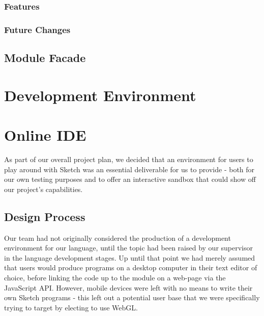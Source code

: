 \documentclass{l3proj}
\begin{document}
\subsection{Features}
\label{arch-shad-features}

\subsection{Future Changes}
\label{arch-shad-future}

\section{Module Facade}
\label{arch-module}

\chapter{Development Environment}
\label{dev}

\chapter{Online IDE}
\label{ide}
As part of our overall project plan, we decided that an environment for users to play around with Sketch was an essential deliverable for us to provide - both for our own testing purposes and to offer an interactive sandbox that could show off our project's capabilities.

\section{Design Process}
\label{ide-design}
Our team had not originally considered the production of a development environment for our language, until the topic had been raised by our supervisor in the language development stages. Up until that point we had merely assumed that users would produce programs on a desktop computer in their text editor of choice, before linking the code up to the module on a web-page via the JavaScript API. However, mobile devices were left with no means to write their own Sketch programs - this left out a potential user base that we were specifically trying to target by electing to use WebGL.
\end{document}
